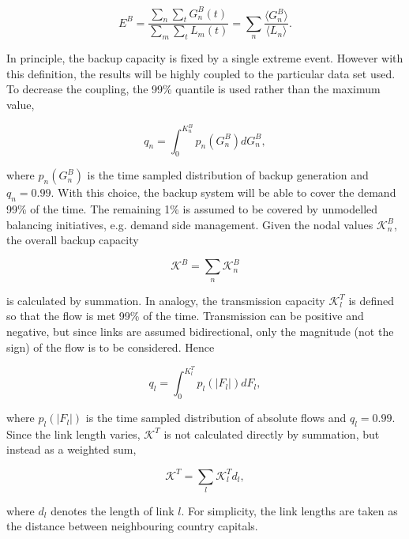 \documentclass[a4paper, 5p, sort&compress]{elsarticle}%
\begin{document}
\begin{equation}
  \label{eq:backup-energy}
  E^{B} =\frac{\sum_{n} \sum_{t} G^{B}_{n}(t)}{\sum_{m} \sum_{t}
    L_{m}(t)} = \sum_{n} \frac{\langle G^{B}_{n} \rangle}{\langle L_{n}
    \rangle} .
\end{equation}

In principle, the backup capacity is fixed by a single extreme
event. However with this definition, the results will be highly
coupled to the particular data set used. To decrease the coupling, the
99\% quantile is used rather than the maximum value,

\begin{equation}
  \label{eq:2}
  q_{n} = \int _{0} ^{K_{n}^{B}} p_{n}(G^{B}_{n})dG^{B}_{n},
\end{equation}

where $p_{n}(G^{B}_{n})$ is the time sampled distribution of backup
generation and $q_{n} = 0.99$. With this choice, the backup system
will be able to cover the demand 99\% of the time. The remaining 1\%
is assumed to be covered by unmodelled balancing initiatives,
e.g. demand side management. Given the nodal values
$\mathcal{K}^{B}_{n}$, the overall backup capacity

\begin{equation}
  \label{eq:4}
  \mathcal{K}^{B} = \sum_{n} \mathcal{K}^{B}_{n}
\end{equation}

is calculated by summation. In analogy, the transmission capacity $\mathcal{K}^{T}_{l}$ is defined
so that the flow is met 99\% of the time. Transmission can be
positive and negative, but since links are assumed bidirectional, only
the magnitude (not the sign) of the flow is to be considered. Hence

\begin{equation}
  \label{eq:2}
  q_{l} = \int _{0} ^{K_{l}^{T}} p_{l}(|F_{l}|)dF_{l},
\end{equation}

where $p_{l}(|F_{l}|)$ is the time sampled distribution of absolute
flows and $q_{l} = 0.99$. Since the link length varies,
$\mathcal{K}^{T}$ is not calculated directly by summation, but instead
as a weighted sum,

\begin{equation}
  \label{eq:4}
  \mathcal{K}^{T} = \sum_{l} \mathcal{K}^{T}_{l} d_{l},
\end{equation}

where $d_{l}$ denotes the length of link $l$. For simplicity, the link
lengths are taken as the distance between neighbouring country
capitals. %
\end{document}
